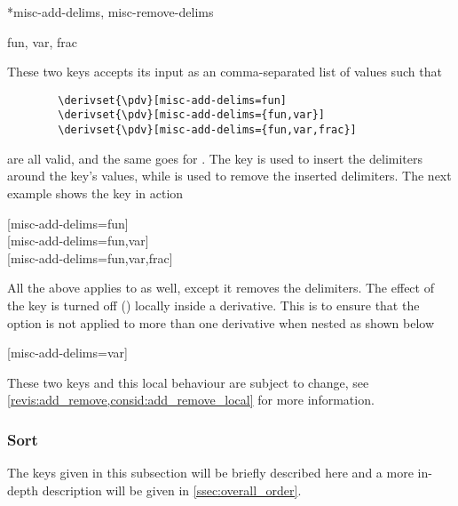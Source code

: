 \documentclass[final,british,10pt]{scrartcl}
\theoremstyle{remark}
\begin{document}
	\begin{option}*{misc-add-delims, misc-remove-delims}
		\begin{values}
			fun, var, frac
		\end{values}
		These two keys accepts its input as an comma-separated list of values such that
		\begin{verbatim}
		\derivset{\pdv}[misc-add-delims=fun]
		\derivset{\pdv}[misc-add-delims={fun,var}]
		\derivset{\pdv}[misc-add-delims={fun,var,frac}]
		\end{verbatim}
		are all valid, and the same goes for  . The key  is used to insert the delimiters around the key's values, while  is used to remove the inserted delimiters. The next example shows the key  in action
		
		\begin{example}
			\derivset{\pdv}[misc-add-delims=fun]             \\
			\derivset{\pdv}[misc-add-delims={fun,var}]       \\
			\derivset{\pdv}[misc-add-delims={fun,var,frac}] 
		\end{example}
		
		\noindent All the above applies to  as well, except it removes the delimiters. The effect of the key  is turned off () locally inside a derivative. This is to ensure that the option is not applied to more than one derivative when nested as shown below
		
		\begin{example}
			\derivset{\pdv}[misc-add-delims=var] \pdv*{\pdv{y}{x}}{x}
		\end{example}
		
		\noindent These two keys and this local behaviour are subject to change, see \cref{revis:add_remove,consid:add_remove_local} for more information.
	\end{option}
	
	\subsubsection*{Sort}
	The keys given in this subsection will be briefly described here and a more in-depth description will be given in \cref{ssec:overall_order}.
	
\end{document}
